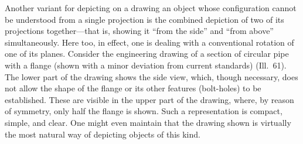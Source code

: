 Another variant for depicting on a drawing an object whose configuration cannot be
understood from a single projection is the combined depiction of two of its projections
together---that is, showing it ``from the side'' and ``from above'' simultaneously.
Here too, in effect, one is dealing with a conventional rotation of one of its planes.
Consider the engineering drawing of a section of circular pipe with a flange (shown with
a minor deviation from current standards) (Ill.~61).  The lower part of the drawing shows
the side view, which, though necessary, does not allow the shape of the flange or its
other features (bolt-holes) to be established.  These are visible in the upper part of
the drawing, where, by reason of symmetry, only half the flange is shown.  Such a
representation is compact, simple, and clear.  One might even maintain that the drawing
shown is virtually the most natural way of depicting objects of this kind.




